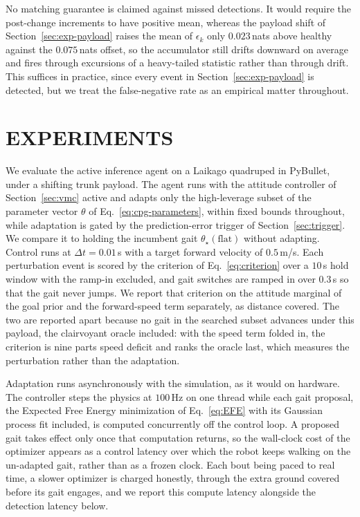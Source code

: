 \documentclass[lettersize,journal]{IEEEtran}
\begin{document}
No matching guarantee is claimed against missed detections.
It would require the post-change increments to have positive mean, whereas the payload shift of Section~\ref{sec:exp-payload} raises the mean of $\epsilon_k$ only $0.023$\,nats above healthy against the $0.075$\,nats offset, so the accumulator still drifts downward on average and fires through excursions of a heavy-tailed statistic rather than through drift.
This suffices in practice, since every event in Section~\ref{sec:exp-payload} is detected, but we treat the false-negative rate as an empirical matter throughout.

\section{EXPERIMENTS}
\label{sec:experiments}

We evaluate the active inference agent on a Laikago quadruped in PyBullet, under a shifting trunk payload.
The agent runs with the attitude controller of Section~\ref{sec:vmc} active and adapts only the high-leverage subset of the parameter vector $\theta$ of Eq.~\ref{eq:cpg-parameters}, within fixed bounds throughout, while adaptation is gated by the prediction-error trigger of Section~\ref{sec:trigger}.
We compare it to holding the incumbent gait $\theta_{\star}(\text{flat})$ without adapting.
Control runs at $\Delta t = 0.01$\,s with a target forward velocity of $0.5$\,m/s.
Each perturbation event is scored by the criterion of Eq.~\ref{eq:criterion} over a $10$\,s hold window with the ramp-in excluded, and gait switches are ramped in over $0.3$\,s so that the gait never jumps.
We report that criterion on the attitude marginal of the goal prior and the forward-speed term separately, as distance covered.
The two are reported apart because no gait in the searched subset advances under this payload, the clairvoyant oracle included: with the speed term folded in, the criterion is nine parts speed deficit and ranks the oracle last, which measures the perturbation rather than the adaptation.

Adaptation runs asynchronously with the simulation, as it would on hardware.
The controller steps the physics at $100$\,Hz on one thread while each gait proposal, the Expected Free Energy minimization of Eq.~\ref{eq:EFE} with its Gaussian process fit included, is computed concurrently off the control loop.
A proposed gait takes effect only once that computation returns, so the wall-clock cost of the optimizer appears as a control latency over which the robot keeps walking on the un-adapted gait, rather than as a frozen clock.
Each bout being paced to real time, a slower optimizer is charged honestly, through the extra ground covered before its gait engages, and we report this compute latency alongside the detection latency below.
\end{document}
